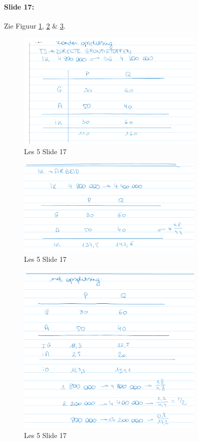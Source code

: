 \documentclass[10pt,a4paper]{report}
\begin{document}
\paragraph{Slide 17:} Zie Figuur \ref{les05_01}, \ref{les05_02} $\&$ \ref{les05_03}.

\begin{figure}[h!]
\centering
\includegraphics[width=90mm]{Les05_01.png}
\caption{Les 5 Slide 17} 
\label{les05_01}
\end{figure}

\begin{figure}[h!]
\centering
\includegraphics[width=90mm]{Les05_02.png}
\caption{Les 5 Slide 17} 
\label{les05_02}
\end{figure}

\begin{figure}[h!]
\centering
\includegraphics[width=90mm]{Les05_03.png}
\caption{Les 5 Slide 17} 
\label{les05_03}
\end{figure}
\end{document}
